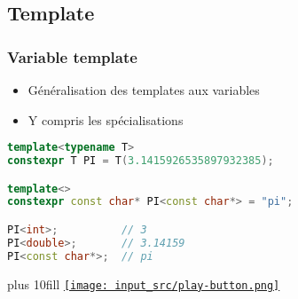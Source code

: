 \documentclass[C++.tex]{subfiles}
\begin{document}
\subsection*{Template}
\begin{frame}[fragile]
	\frametitle{Variable template}
	\begin{itemize}
		\item Généralisation des templates aux variables
		\item Y compris les spécialisations
	\end{itemize}

	\begin{lstlisting}[language=C++]
template<typename T>
constexpr T PI = T(3.1415926535897932385);

template<>
constexpr const char* PI<const char*> = "pi";

PI<int>;          // 3
PI<double>;       // 3.14159
PI<const char*>;  // pi\end{lstlisting}

	\vskip 10mm plus 10fill
	\hfill
	\href{https://godbolt.org/#g:!((g:!((g:!((h:codeEditor,i:(filename:'1',fontScale:14,fontUsePx:'0',j:1,lang:c%2B%2B,selection:(endColumn:1,endLineNumber:15,positionColumn:1,positionLineNumber:15,selectionStartColumn:1,selectionStartLineNumber:15,startColumn:1,startLineNumber:15),source:'%23include+%3Ciostream%3E%0A%0Atemplate%3Ctypename+T%3E%0Aconstexpr+T+PI+%3D+T(3.1415926535897932385)%3B%0A%0Atemplate%3C%3E%0Aconstexpr+const+char*+PI%3Cconst+char*%3E+%3D+%22pi%22%3B%0A%0Aint+main()%0A%7B%0A++std::cout+%3C%3C+PI%3Cint%3E+%3C%3C+!'%5Cn!'%3B%0A++std::cout+%3C%3C+PI%3Cdouble%3E+%3C%3C+!'%5Cn!'%3B%0A++std::cout+%3C%3C+PI%3Cconst+char*%3E+%3C%3C+!'%5Cn!'%3B%0A%7D%0A'),l:'5',n:'0',o:'C%2B%2B+source+%231',t:'0')),k:50,l:'4',n:'0',o:'',s:0,t:'0'),(g:!((h:executor,i:(argsPanelShown:'1',compilationPanelShown:'0',compiler:g112,compilerOutShown:'0',execArgs:'',execStdin:'',fontScale:14,fontUsePx:'0',j:1,lang:c%2B%2B,libs:!((name:boost,ver:'175')),options:'-std%3Dc%2B%2B14',source:1,stdinPanelShown:'1',tree:'1',wrap:'0'),l:'5',n:'0',o:'Executor+x86-64+gcc+11.2+(C%2B%2B,+Editor+%231)',t:'0')),header:(),k:50,l:'4',n:'0',o:'',s:0,t:'0')),l:'2',n:'0',o:'',t:'0')),version:4}{\texttt{[image: input\_src/play-button.png]}}
\end{frame}
\end{document}
